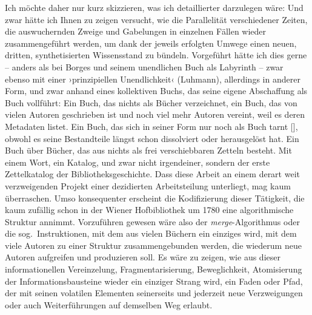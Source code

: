 \documentclass[a4paper,11pt]{article}
\newcommand{\inanf}[1]{›#1‹}
\newcommand{\anzeige}{\textbf{\color{hokkaido}\huge{\raisebox{-0.18ex}{$\bullet$}}\color{black}}}
\begin{document}
Ich möchte daher nur kurz skizzieren, was ich detaillierter darzulegen wäre: Und zwar hätte ich Ihnen zu zeigen versucht, wie die Parallelität verschiedener Zeiten, die auswuchernden Zweige und Gabelungen in einzelnen Fällen wieder zusammengeführt werden, um dank der jeweils erfolgten Umwege einen neuen, dritten, synthetisierten Wissensstand zu bündeln. Vorgeführt hätte ich dies gerne – anders als bei Borges und seinem unendlichen Buch als Labyrinth – zwar ebenso mit einer \inanf{prinzipiellen Unendlichkeit} (Luhmann), allerdings in anderer Form, und zwar anhand eines kollektiven Buchs, das seine eigene Abschaffung als Buch vollführt: Ein Buch, das nichts als Bücher verzeichnet, ein Buch, das von vielen Autoren geschrieben ist und noch viel mehr Autoren vereint, weil es deren Metadaten listet. Ein Buch, das sich in seiner Form nur noch als Buch tarnt [\anzeige], obwohl es seine Bestandteile längst schon dissolviert oder herausgelöst hat. Ein Buch über Bücher, das aus nichts als frei verschiebbaren Zetteln besteht. Mit einem Wort, ein Katalog, und zwar nicht irgendeiner, sondern der erste Zettelkatalog der Bibliotheksgeschichte. Dass diese Arbeit an einem derart weit verzweigenden Projekt einer dezidierten Arbeitsteilung unterliegt, mag kaum überraschen. Umso konsequenter erscheint die Kodifizierung dieser Tätigkeit, die kaum zufällig schon in der Wiener Hofbibliothek um 1780 eine algorithmische Struktur annimmt. Vorzuführen gewesen wäre also der \emph{merge}-Algorithmus oder die sog.\ Instruktionen, mit dem aus vielen Büchern ein einziges wird, mit dem viele Autoren zu einer Struktur zusammengebunden werden, die wiederum neue Autoren aufgreifen und produzieren soll. Es wäre zu zeigen, wie aus dieser informationellen Vereinzelung, Fragmentarisierung, Beweglichkeit, Atomisierung der Informationsbausteine wieder ein einziger Strang wird, ein Faden oder Pfad, der mit seinen volatilen Elementen seinerseits und jederzeit neue Verzweigungen oder auch Weiterführungen auf demselben Weg erlaubt.
\end{document}
